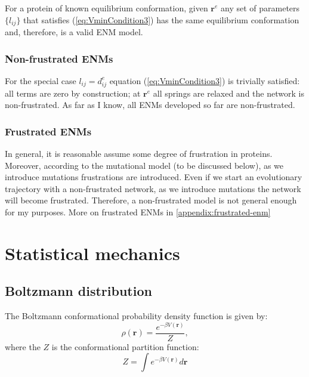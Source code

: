 \documentclass[12pt]{article}
\newcommand{\lij}{l_{ij}}
\newcommand{\dijEq}{d_{ij}^{e}}
\newcommand{\rvector}{\mathbf{r}}
\newcommand{\rvectorEq}{\mathbf{r}^{e}}
\begin{document}
For a protein of known equilibrium conformation, given $\rvectorEq$ any set of parameters $\{\lij\}$ that satisfies (\ref{eq:VminCondition3}) has the same equilibrium conformation and, therefore, is a valid ENM model.

\subsubsection{Non-frustrated ENMs}
For the special case $\lij = \dijEq$ equation (\ref{eq:VminCondition3}) is trivially satisfied: all terms are zero by construction; at $\rvectorEq$ all springs are relaxed and the network is non-frustrated. As far as I know, all ENMs developed so far are non-frustrated.

\subsubsection{Frustrated ENMs}
In general, it is reasonable assume some degree of frustration in proteins.
Moreover, according to the mutational model (to be discussed below), as we introduce mutations frustrations are introduced. Even if we start an evolutionary trajectory with a non-frustrated network, as we introduce mutations the network will become frustrated.
Therefore, a non-frustrated model is not general enough for my purposes.
More on frustrated ENMs in \ref{appendix:frustrated-enm}


\section{Statistical mechanics}

\subsection{Boltzmann distribution}

The Boltzmann conformational probability density function is given by:
\begin{equation} 
\label{eq:BoltzmannDistribution}
\rho(\rvector) = \frac{e^{-\beta V(\rvector)}}{Z},
\end{equation}
where the $Z$ is the conformational partition function:
\begin{equation}
\label{eq:partitionFunctionDefinition}
Z = \int e^{-\beta V(\rvector)} d\mathbf{\rvector}
\end{equation}
\end{document}
